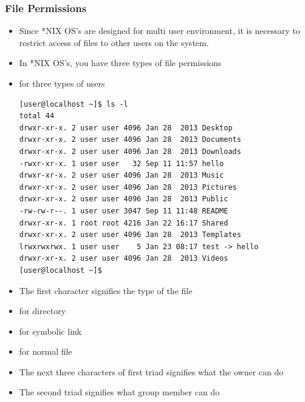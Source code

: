 \documentclass[10pt,t]{beamer}
\begin{document}
\begin{frame}
  \frametitle{\small File Permissions}
  \begin{itemize}
    \item Since *NIX OS's are designed for multi user environment, it is necessary to restrict access of files to other users on the system.
    \item In *NIX OS's, you have three types of file permissions
    \item for three types of users
    \begin{Verbatim}[formatcom=\color{lubrown},fontsize=\scriptsize]
[user@localhost ~]$ ls -l
total 44
drwxr-xr-x. 2 user user 4096 Jan 28  2013 Desktop
drwxr-xr-x. 2 user user 4096 Jan 28  2013 Documents
drwxr-xr-x. 2 user user 4096 Jan 28  2013 Downloads
-rwxr-xr-x. 1 user user   32 Sep 11 11:57 hello
drwxr-xr-x. 2 user user 4096 Jan 28  2013 Music
drwxr-xr-x. 2 user user 4096 Jan 28  2013 Pictures
drwxr-xr-x. 2 user user 4096 Jan 28  2013 Public
-rw-rw-r--. 1 user user 3047 Sep 11 11:48 README
drwxr-xr-x. 1 root root 4216 Jan 22 16:17 Shared
drwxr-xr-x. 2 user user 4096 Jan 28  2013 Templates
lrwxrwxrwx. 1 user user    5 Jan 23 08:17 test -> hello
drwxr-xr-x. 2 user user 4096 Jan 28  2013 Videos
[user@localhost ~]$ 
    \end{Verbatim}
    \item The first character signifies the type of the file
    \item[]  for directory
    \item[]  for symbolic link
    \item[] \Verblubrown{-} for normal file
    \item The next three characters of first triad signifies what the owner can do
    \item The second triad signifies what group member can do

\end{itemize}
\end{frame}
\end{document}

